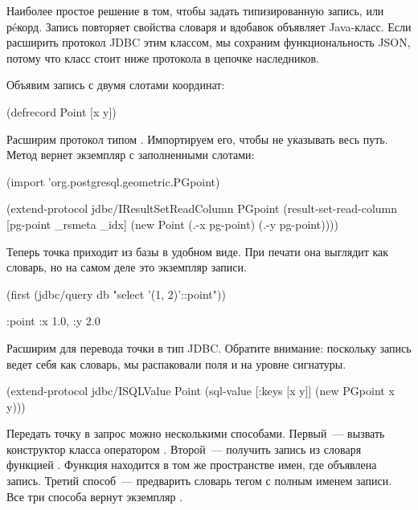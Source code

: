 Наиболее простое решение в том, чтобы задать типизированную запись, или рéкорд. Запись повторяет свойства словаря и вдобавок объявляет Java-класс. Если расширить протокол JDBC этим классом, мы сохраним функциональность JSON, потому что класс стоит ниже протокола  в цепочке наследников.

Объявим запись с двумя слотами координат:

\begin{english}
  \begin{clojure}
(defrecord Point [x y])
  \end{clojure}
\end{english}

Расширим протокол  типом . Импортируем его, чтобы не указывать весь путь. Метод  вернет экземпляр  с заполненными слотами:

\begin{english}
  \begin{clojure}
(import 'org.postgresql.geometric.PGpoint)

(extend-protocol jdbc/IResultSetReadColumn
  PGpoint
  (result-set-read-column [pg-point _rsmeta _idx]
    (new Point (.-x pg-point) (.-y pg-point))))
  \end{clojure}
\end{english}

Теперь точка приходит из базы в удобном виде. При печати она выглядит как словарь, но на самом деле это экземпляр записи.


\begin{english}
  \begin{clojure}
(first (jdbc/query db "select '(1, 2)'::point"))

{:point {:x 1.0, :y 2.0}}
  \end{clojure}
\end{english}

Расширим  для перевода точки в тип JDBC. Обратите внимание: поскольку запись ведет себя как словарь, мы распаковали поля  и  на уровне сигнатуры.

\begin{english}
  \begin{clojure}
(extend-protocol jdbc/ISQLValue
  Point
  (sql-value [{:keys [x y]}]
    (new PGpoint x y)))
  \end{clojure}
\end{english}

Передать точку в запрос можно несколькими способами. Первый~--- вызвать конструктор класса оператором . Второй~--- получить запись из словаря функцией . Функция находится в том же пространстве имен, где объявлена запись. Третий способ~--- предварить словарь тегом с полным именем записи. Все три способа вернут экземпляр .

